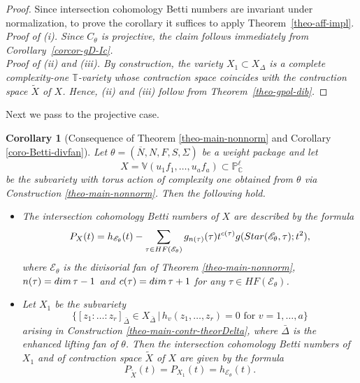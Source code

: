 \documentclass[11pt, reqno]{amsart}
\theoremstyle{plain}
\newtheorem{corollary}[theorem]{Corollary}
\theoremstyle{definition}
\theoremstyle{remark}
\begin{document}
\begin{proof}
   Since intersection cohomology Betti numbers are invariant under normalization, to prove the corollary it suffices to apply Theorem~\ref{theo-aff-impl}.\\


\noindent\it{Proof of (i).}
Since $C_{\theta}$ is projective, the claim follows immediately from Corollary~\ref{corcor-gD-Ic}.\\


\noindent\it{Proof of (ii) and (iii).}
By construction, the variety $X_{1}\subset X_{\Delta}$ is a complete complexity-one $\mathbb{T}$-variety whose contraction space coincides with the contraction space $\widetilde{X}$ of $X$.  Hence, (ii) and (iii) follow from Theorem~\ref{theo-gpol-dib}.
\end{proof}

Next we pass to the projective case.
\begin{corollary}[Consequence of Theorem \ref{theo-main-nonnorm} and Corollary \ref{coro-Betti-divfan}]\label{cor-proj2222}
Let $\theta =  (\overline{N}, N, F, S, \Sigma)$ be a weight package and let 
$$X =  \mathbb{V}(u_{1} f_{1}, \ldots, u_{a} f_{a})\subset \mathbb{P}_{\mathbb{C}}^{\ell}$$
be the subvariety with torus action of complexity one obtained from $\theta$ via Construction \ref{theo-main-nonnorm}. Then the following hold. 
\begin{itemize}
\item[$(i)$] The intersection cohomology Betti numbers of $X$ are described by the formula
$$P_{X}(t)  =  h_{\mathscr{E}_{\theta}}(t) -  \sum_{\tau\in HF(\mathscr{E}_{\theta})} g_{n(\tau)}(\tau) t^{c(\tau)} g({\rm Star}(\mathscr{E}_{\theta}, \tau); t^{2}),$$
where $\mathscr{E}_{\theta}$ is the divisorial fan of Theorem \ref{theo-main-nonnorm}, $n(\tau) =  {\rm dim}\, \tau - 1$ and $c(\tau)  =  {\rm dim}\, \tau +1$ for any $\tau \in HF(\mathscr{E}_{\theta})$.
\item[$(ii)$] Let $X_{1}$ be the subvariety 
$$\{[z_{1}:\ldots: z_{r}]_{\bar{\Delta}}\in X_{\bar{\Delta}}\, |\, h_{v}(z_{1}, \ldots, z_{r}) =  0 \text{ for } v =  1, \ldots, a\}$$
arising in Construction \ref{theo-main-contr-theorDelta}, where $\bar{\Delta}$ is the enhanced lifting fan of $\theta$. Then the intersection cohomology Betti numbers of $X_{1}$ and of contraction space $\widetilde{X}$ of $X$  are given by the formula
$$ P_{\widetilde{X}}(t) =  P_{X_{1}}(t)  =  h_{\mathscr{E}_{\theta}}(t).$$
\end{itemize}
\end{corollary}
\end{document}
